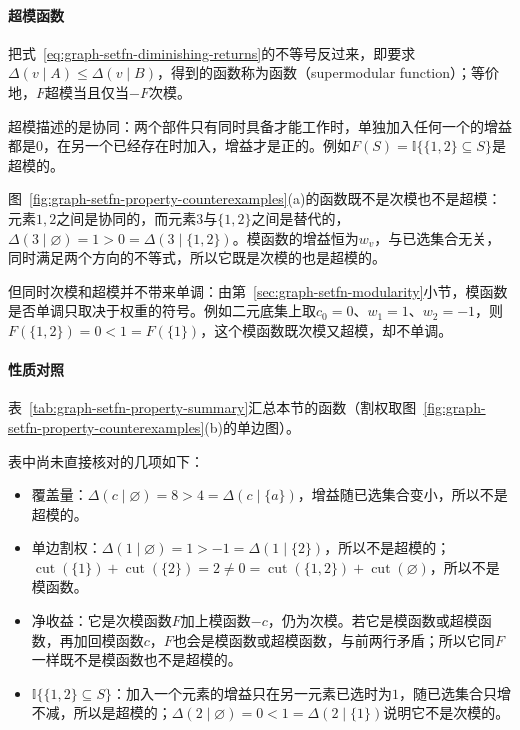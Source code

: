 \paragraph{超模函数}
把式~\eqref{eq:graph-setfn-diminishing-returns}的不等号反过来，即要求$\Delta(v\mid A)\leq\Delta(v\mid B)$，得到的函数称为函数（supermodular function）；等价地，$F$超模当且仅当$-F$次模。

超模描述的是协同：两个部件只有同时具备才能工作时，单独加入任何一个的增益都是$0$，在另一个已经存在时加入，增益才是正的。例如$F(S)=\mathbb I\{\{1,2\}\subseteq S\}$是超模的。

图~\ref{fig:graph-setfn-property-counterexamples}(a)的函数既不是次模也不是超模：元素$1,2$之间是协同的，而元素$3$与$\{1,2\}$之间是替代的，$\Delta(3\mid\varnothing)=1>0=\Delta(3\mid\{1,2\})$。模函数的增益恒为$w_v$，与已选集合无关，同时满足两个方向的不等式，所以它既是次模的也是超模的。

但同时次模和超模并不带来单调：由第~\ref{sec:graph-setfn-modularity}小节，模函数是否单调只取决于权重的符号。例如二元底集上取$c_0=0$、$w_1=1$、$w_2=-1$，则$F(\{1,2\})=0<1=F(\{1\})$，这个模函数既次模又超模，却不单调。

\paragraph{性质对照}
表~\ref{tab:graph-setfn-property-summary}汇总本节的函数（割权取图~\ref{fig:graph-setfn-property-counterexamples}(b)的单边图）。

表中尚未直接核对的几项如下：
\begin{itemize}
  \item 覆盖量：$\Delta(c\mid\varnothing)=8>4=\Delta(c\mid\{a\})$，增益随已选集合变小，所以不是超模的。
  \item 单边割权：$\Delta(1\mid\varnothing)=1>-1=\Delta(1\mid\{2\})$，所以不是超模的；$\operatorname{cut}(\{1\})+\operatorname{cut}(\{2\})=2\neq0=\operatorname{cut}(\{1,2\})+\operatorname{cut}(\varnothing)$，所以不是模函数。
  \item 净收益：它是次模函数$F$加上模函数$-c$，仍为次模。若它是模函数或超模函数，再加回模函数$c$，$F$也会是模函数或超模函数，与前两行矛盾；所以它同$F$一样既不是模函数也不是超模的。
  \item $\mathbb I\{\{1,2\}\subseteq S\}$：加入一个元素的增益只在另一元素已选时为$1$，随已选集合只增不减，所以是超模的；$\Delta(2\mid\varnothing)=0<1=\Delta(2\mid\{1\})$说明它不是次模的。
\end{itemize}

